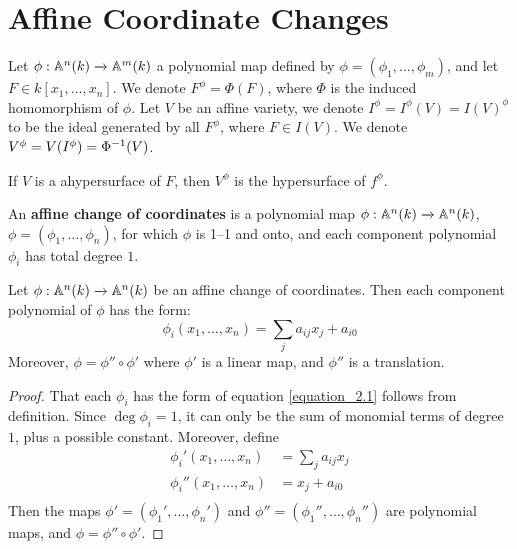 \section{Affine Coordinate Changes}

Let $\phi:\mathbb{A}^n(k) \xrightarrow{} \mathbb{A}^m(k)$ a polynomial map defined by
$\phi=(\phi_1, \dots, \phi_m)$, and let $F \in k[x_1, \dots, x_n]$. We denote
$F^\phi=\Phi(F)$, where $\Phi$ is the induced homomorphism of $\phi$. Let $V$ be
an affine variety, we denote $I^\phi=I^\phi(V)=I(V)^\phi$ to be the ideal
generated by all $F^\phi$, where  $F \in I(V)$. We denote
$V^\phi=V(I^\phi)=\Phi^{-1}(V)$.

\begin{example}\label{example_2.1}
  If $V$ is a ahypersurface of  $F$, then  $V^\phi$ is the hypersurface of
  $f^\phi$.
\end{example}

\begin{definition}
  An \textbf{affine change of coordinates} is a polynomial map
  $\phi:\mathbb{A}^n(k) \xrightarrow{} \mathbb{A}^n(k)$, $\phi=(\phi_1, \dots, \phi_n)$, for
  which $\phi$ is 1--1 and onto, and each component polynomial $\phi_i$ has
  total degree  $1$.
\end{definition}

\begin{lemma}\label{lemma_2.2.1}
  Let $\phi:\mathbb{A}^n(k) \xrightarrow{} \mathbb{A}^n(k)$ be an affine change of coordinates.
  Then each component polynomial of $\phi$ has the form:
  \begin{equation}\label{equation_2.1}
    \phi_i(x_1, \dots, x_n)=\sum_{j}{a_{ij}x_j}+a_{i0}
  \end{equation}
  Moreover, $\phi=\phi'' \circ \phi'$ where $\phi'$ is a linear map, and
  $\phi''$ is a translation.
\end{lemma}
\begin{proof}
  That each $\phi_i$ has the form of equation \ref{equation_2.1} follows from
  definition. Since $\deg{\phi_i}=1$, it can only be the sum of monomial terms
  of degree $1$, plus a possible constant. Moreover, define
  \begin{align*}
    \phi_i'(x_1, \dots, x_n)  &=  \sum_{j}{a_{ij}x_j} \\
    \phi_i''(x_1, \dots, x_n) &=  x_j+a_{i0} \\
  \end{align*}
  Then the maps $\phi'=(\phi_1', \dots, \phi_n')$ and $\phi''=(\phi_1'', \dots,
  \phi_n'')$ are polynomial maps, and $\phi=\phi'' \circ \phi'$.
\end{proof}

